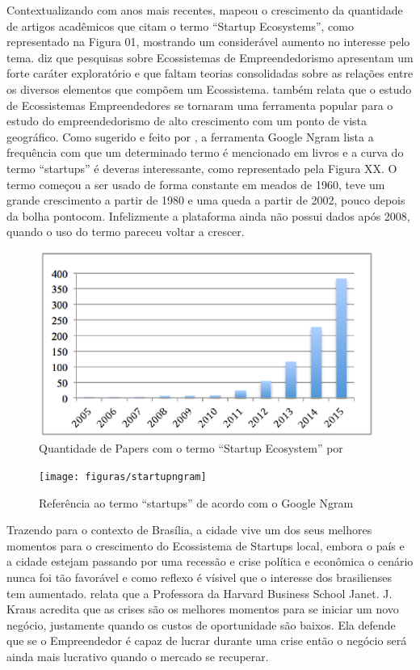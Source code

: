 Contextualizando com anos mais recentes,  mapeou o crescimento da quantidade de artigos acadêmicos que citam o termo ``Startup Ecosystems'', como representado na Figura 01, mostrando um considerável aumento no interesse pelo tema.  diz que pesquisas sobre Ecossistemas de Empreendedorismo apresentam um forte caráter exploratório e que faltam teorias consolidadas sobre as relações entre os diversos elementos que compõem um Ecossistema.  também relata que o estudo de Ecossistemas Empreendedores se tornaram uma ferramenta popular para o estudo do empreendedorismo de alto crescimento com um ponto de vista geográfico. Como sugerido e feito por , a ferramenta Google Ngram lista a frequência com que um determinado termo é mencionado em livros e a curva do termo ``startups'' é deveras interessante, como representado pela Figura XX. O termo começou a ser usado de forma constante em meados de 1960, teve um grande crescimento a partir de 1980 e uma queda a partir de 2002, pouco depois da bolha pontocom. Infelizmente a plataforma ainda não possui dados após 2008, quando o uso do termo pareceu voltar a crescer. 

\begin{figure}[!htb]
	\centering
	\includegraphics[width=11cm,angle=0]{figuras/papers_about_startup_ecosystems}
	\caption{Quantidade de Papers com o termo ``Startup Ecosystem'' por }
	\label{figure:papers_about_startup_ecosystems}
\end{figure}

\begin{figure}[!htb]
	\centering
	\texttt{[image: figuras/startupngram]}
	\caption{Referência ao termo ``startups'' de acordo com o Google Ngram}
	\label{figure:startupngram}
\end{figure}

Trazendo para o contexto de Brasília, a cidade vive um dos seus melhores momentos para o crescimento do Ecossistema de Startups local, embora o país e a cidade estejam passando por uma recessão e crise política e econômica o cenário nunca foi tão favorável e como reflexo é vísivel que o interesse dos brasilienses tem aumentado.  relata que a Professora da Harvard Business School Janet. J. Kraus acredita que as crises são os melhores momentos para se iniciar um novo negócio, justamente quando os custos de oportunidade são baixos. Ela defende que se o Empreendedor é capaz de lucrar durante uma crise então o negócio será ainda mais lucrativo quando o mercado se recuperar.

